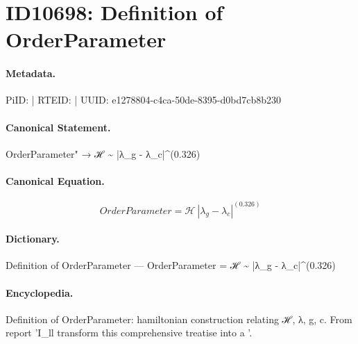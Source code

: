 \section*{ID10698: Definition of OrderParameter}
\paragraph{Metadata.}
PiID:  | RTEID:  | UUID: e1278804-c4ca-50de-8395-d0bd7cb8b230

\paragraph{Canonical Statement.}
OrderParameter" → ℋ \textasciitilde{} |λ\_g - λ\_c|\textasciicircum{}(0.326)

\paragraph{Canonical Equation.}
\[
OrderParameter = ℋ ~ |λ_g - λ_c|^(0.326)
\]

\paragraph{Dictionary.}
Definition of OrderParameter — OrderParameter = ℋ \textasciitilde{} |λ\_g - λ\_c|\textasciicircum{}(0.326)

\paragraph{Encyclopedia.}
Definition of OrderParameter: hamiltonian construction relating ℋ, λ, g, c. From report 'I\_ll transform this comprehensive treatise into a '.
